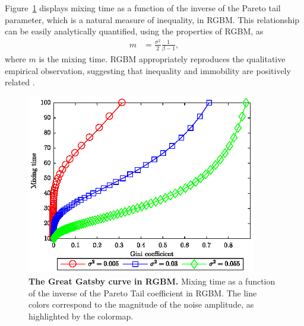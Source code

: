 \documentclass[11pt]{article}
\newcommand{\eref}[1]{Eq.~(\ref{eq:#1})}
\newcommand{\Fref}[1]{Figure~\ref{fig:#1}}
\newcommand{\be}{\begin{equation}}
\newcommand{\ee}{\end{equation}}
\numberwithin{equation}{section}
\begin{document}

\Fref{rgbm-great-gatsby} displays mixing time as a function of the inverse of the Pareto tail parameter, which is a natural measure of inequality, in RGBM. This relationship can be easily analytically quantified, using the properties of RGBM, as
\begin{align}
    m &= \frac{\sigma^2}{2} \frac{1}{\beta-1},
\end{align}
where $m$ is the mixing time.
RGBM appropriately reproduces the qualitative empirical observation, suggesting that inequality and immobility are positively related \citep{krueger2012}. %

\begin{figure}[!htb]
\centering
\includegraphics[width=10cm]{figs/fig_great_gatsby.eps}
\caption{\textbf{The Great Gatsby curve in RGBM.} Mixing time as a function of the inverse of the Pareto Tail coefficient in RGBM. The line colors correspond to the magnitude of the noise amplitude, as highlighted by the colormap.
\label{fig:rgbm-great-gatsby}}
\end{figure}
\FloatBarrier
\end{document}
